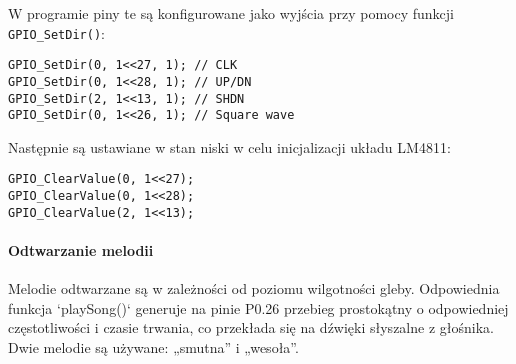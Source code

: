 W programie piny te są konfigurowane jako wyjścia przy pomocy funkcji \texttt{GPIO\_SetDir()}:
\begin{verbatim}
GPIO_SetDir(0, 1<<27, 1); // CLK
GPIO_SetDir(0, 1<<28, 1); // UP/DN
GPIO_SetDir(2, 1<<13, 1); // SHDN
GPIO_SetDir(0, 1<<26, 1); // Square wave 
\end{verbatim}

Następnie są ustawiane w stan niski w celu inicjalizacji układu LM4811:
\begin{verbatim}
GPIO_ClearValue(0, 1<<27);
GPIO_ClearValue(0, 1<<28);
GPIO_ClearValue(2, 1<<13);
\end{verbatim}

\paragraph{Odtwarzanie melodii}
Melodie odtwarzane są w zależności od poziomu wilgotności gleby. Odpowiednia funkcja `playSong()` generuje na pinie P0.26 przebieg prostokątny o odpowiedniej częstotliwości i czasie trwania, co przekłada się na dźwięki słyszalne z głośnika. Dwie melodie są używane: „smutna” i „wesoła”.





